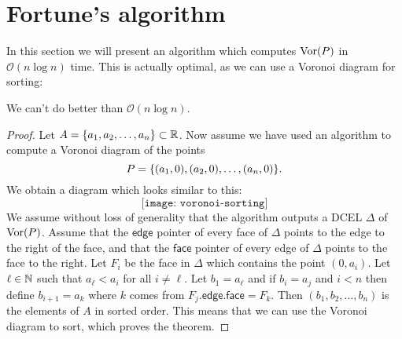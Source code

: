 \section{Fortune's algorithm}
In this section we will present an algorithm which computes $\operatorname{Vor}(P)$ in $\mathcal{O}(n \log n)$ time. This is actually optimal, as we can use a Voronoi diagram for sorting:
\begin{thm} \label{thm:voronoicansort}
We can't do better than $\mathcal{O}(n \log n)$.
\end{thm}
\begin{proof}
Let $A = \{a_1, a_2, \ldots, a_n\} \subset \mathbb{R}$. Now assume we have used an algorithm to compute a Voronoi diagram of the points
\[
    P = \{(a_1, 0), (a_2, 0), \ldots, (a_n, 0)\}.
\]
We obtain a diagram which looks similar to this:
\[
    \texttt{[image: voronoi-sorting]}
\]
We assume without loss of generality that the algorithm outputs a DCEL $\Delta$ of $\operatorname{Vor}(P)$. Assume that the $\textsf{edge}$ pointer of every face of $\Delta$ points to the edge to the right of the face, and that the $\textsf{face}$ pointer of every edge of $\Delta$ points to the face to the right. Let $F_i$ be the face in $\Delta$ which contains the point $(0, a_i)$. Let $\ell \in \mathbb{N}$ such that $a_{\ell} < a_i$ for all $i \ne \ell$. Let $b_1 = a_{\ell}$ and if $b_i = a_{j}$ and $i < n$ then define $b_{i+1} = a_k$ where $k$ comes from $F_{j}\textsf{.edge.face} = F_k$. Then $(b_1, b_2, \ldots, b_n)$ is the elements of $A$ in sorted order. This means that we can use the Voronoi diagram to sort, which proves the theorem.
\end{proof}

 \\


